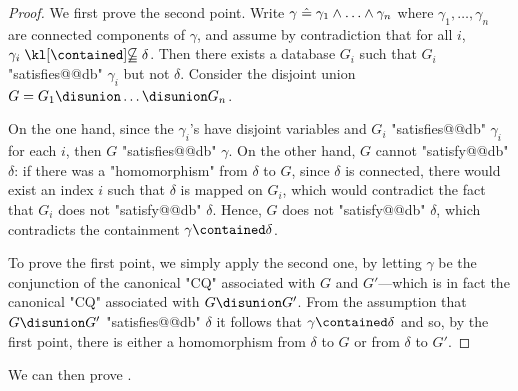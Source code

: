 \begin{proof}
	We first prove the second point.
    Write $\gamma \mathrel{\hat{=}} \gamma_1 \land \dotsc \land \gamma_n$ where $\gamma_1,\dotsc,\gamma_n$
    are connected components of $\gamma$, and assume by contradiction that
    for all $i$, $\gamma_i \notcontained \delta$. Then there exists a database $G_i$
    such that $G_i$ "satisfies@@db" $\gamma_i$ but not $\delta$.
    Consider the disjoint union $G = G_1 \disunion \dotsc \disunion G_n$.

    On the one hand, since the $\gamma_i$'s have disjoint variables
    and $G_i$ "satisfies@@db" $\gamma_i$ for each $i$, then $G$ "satisfies@@db" $\gamma$.
    On the other hand, $G$ cannot "satisfy@@db" $\delta$:
    if there was a "homomorphism" from $\delta$ to $G$,
    since $\delta$ is connected, there would exist an index $i$
    such that $\delta$ is mapped on $G_i$, which would contradict the
    fact that $G_i$ does not "satisfy@@db" $\delta$.
    Hence, $G$ does not "satisfy@@db" $\delta$, which contradicts the containment
    $\gamma \contained \delta$.

	To prove the first point, we simply apply the second one, by letting $\gamma$
	be the conjunction of the canonical "CQ" associated with $G$ and $G'$---which
	is in fact the canonical "CQ" associated with $G\disunion G'$. From the assumption
    that $G \disunion G'$ "satisfies@@db" $\delta$ it follows that $\gamma \contained \delta$
    and so, by the first point, there is either a homomorphism from $\delta$
    to $G$ or from $\delta$ to $G'$.
\end{proof}

We can then prove .

